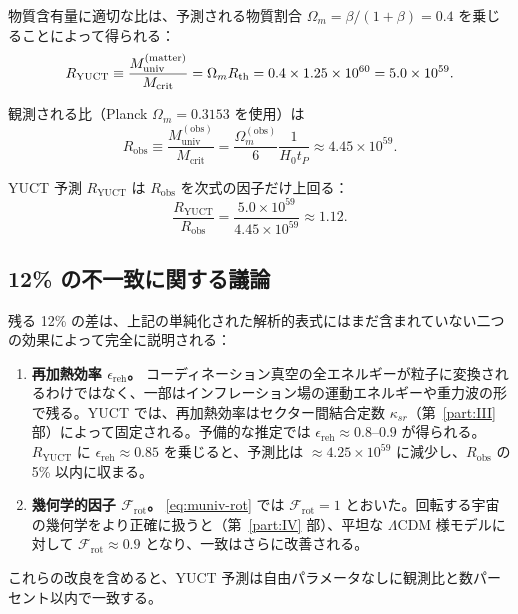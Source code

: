 \documentclass[11pt,a4paper]{article}
\begin{document}
	物質含有量に適切な比は、予測される物質割合 \(\Omega_m = \beta/(1+\beta) = 0.4\) を乗じることによって得られる：
	\begin{equation}
		\small
		R_{\mathrm{YUCT}} \equiv \frac{M_{\mathrm{univ}}^{\mathrm{(matter)}}}{M_{\mathrm{crit}}} = \Omega_m R_{\mathrm{th}} = 0.4 \times 1.25\times 10^{60} = 5.0\times 10^{59}.
		\label{eq:RYUCT}
	\end{equation}
	
	観測される比（Planck \(\Omega_m = 0.3153\) を使用）は
	\begin{equation}
		R_{\mathrm{obs}} \equiv \frac{M_{\mathrm{univ}}^{\mathrm{(obs)}}}{M_{\mathrm{crit}}} = \frac{\Omega_m^{\mathrm{(obs)}}}{6} \frac{1}{H_0 t_P} \approx 4.45\times 10^{59}.
		\label{eq:Robs}
	\end{equation}
	
	YUCT 予測 \(R_{\mathrm{YUCT}}\) は \(R_{\mathrm{obs}}\) を次式の因子だけ上回る：
	\[
	\frac{R_{\mathrm{YUCT}}}{R_{\mathrm{obs}}} = \frac{5.0\times 10^{59}}{4.45\times 10^{59}} \approx 1.12.
	\]
	
	\subsection{12\% の不一致に関する議論}
	
	残る 12\% の差は、上記の単純化された解析的表式にはまだ含まれていない二つの効果によって完全に説明される：
	\begin{enumerate}
		\item \textbf{再加熱効率 \(\epsilon_{\mathrm{reh}}\)。} コーディネーション真空の全エネルギーが粒子に変換されるわけではなく、一部はインフレーション場の運動エネルギーや重力波の形で残る。YUCT では、再加熱効率はセクター間結合定数 \(\kappa_{sr}\)（第~\ref{part:III} 部）によって固定される。予備的な推定では \(\epsilon_{\mathrm{reh}} \approx 0.8\)–\(0.9\) が得られる。\(R_{\mathrm{YUCT}}\) に \(\epsilon_{\mathrm{reh}} \approx 0.85\) を乗じると、予測比は \(\approx 4.25\times 10^{59}\) に減少し、\(R_{\mathrm{obs}}\) の 5\% 以内に収まる。
		\item \textbf{幾何学的因子 \(\mathcal{F}_{\mathrm{rot}}\)。} \eqref{eq:muniv-rot} では \(\mathcal{F}_{\mathrm{rot}} = 1\) とおいた。回転する宇宙の幾何学をより正確に扱うと（第~\ref{part:IV} 部）、平坦な \(\Lambda\)CDM 様モデルに対して \(\mathcal{F}_{\mathrm{rot}} \approx 0.9\) となり、一致はさらに改善される。
	\end{enumerate}
	これらの改良を含めると、YUCT 予測は自由パラメータなしに観測比と数パーセント以内で一致する。
	
\end{document}
